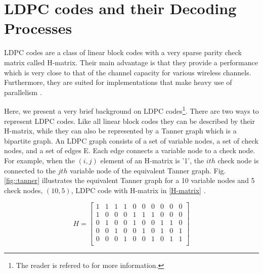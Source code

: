 \documentclass[conference]{IEEEtran}
\begin{document}
\section{LDPC codes and their Decoding Processes}\label{sec2}

LDPC codes are a class of linear block codes with a very sparse parity check matrix called H-matrix. Their main advantage is that they provide a performance which is very close to that of the channel capacity for various wireless channels. Furthermore, they are suited for implementations that make heavy use of parallelism \cite{art_castello}.

Here, we present a very brief background on LDPC codes\footnote{The reader is refered to \cite{art_castello} for more information.}. There are two ways to represent LDPC codes. Like all linear block codes they can be described by their H-matrix, while they can also be represented by a Tanner graph which is a bipartite graph. An LDPC graph consists of a set of variable nodes, a set of check nodes, and a set of edges E. Each edge connects a variable node to a check node. For example, when the $(i,j)$ element of an H-matrix is '1', the $ith$ check node is connected to the $jth$ variable node of the equivalent Tanner graph. Fig.\ref{fig::tanner} illustrates the equivalent Tanner graph for a 10 variable nodes and 5 check nodes, $(10,5)$, LDPC code with H-matrix in \eqref{H-matrix} \cite{art_castello}.

\begin{equation}\label{H-matrix}
H=
  \begin{bmatrix}
    1 & 1 & 1 & 1 & 0 &0 &0 &0 &0 &0 \\
    1 & 0 & 0 & 0 & 1 &1 &1 &0 &0 &0 \\
    0 & 1 & 0 & 0 & 1 &0 &0 &1 &1 &0 \\
    0 & 0 & 1 & 0 & 0 &1 &0 &1 &0 &1 \\
    0 & 0 & 0 & 1 & 0 &0 &1 &0 &1 &1 \\
  \end{bmatrix}
\end{equation}
\end{document}
